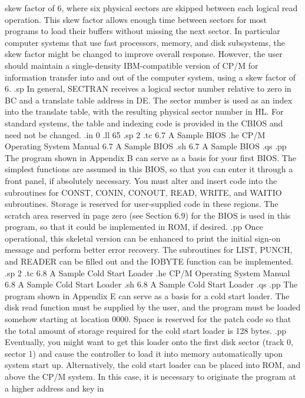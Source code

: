 skew factor of 6, where six physical sectors are 
skipped between each logical read operation.  
This skew factor allows enough time between 
sectors for most programs to load their buffers 
without missing the next sector.  In particular 
computer systems that use fast processors, 
memory, and disk subsystems, the skew factor might 
be changed to improve overall response.   
However, the user should maintain a single-density 
IBM-compatible version of CP/M for 
information transfer into and out of the 
computer system, using a skew factor of 6.  
.sp
In general, SECTRAN receives a logical sector 
number relative to zero in BC and a translate 
table address in DE.  The sector number is used 
as an index into the translate table, with the 
resulting physical sector number 
in HL.  For standard systems, the table and 
indexing code is provided in the CBIOS and 
need not be changed.
.in 0
.ll 65
.sp 2
.tc    6.7  A Sample BIOS
.he CP/M Operating System Manual                   6.7  A Sample BIOS
.sh
6.7  A Sample BIOS
.qs
.pp
The program shown in Appendix B can serve as a basis for your 
first BIOS.  The simplest functions are assumed in this BIOS, so 
that you can enter it through a front panel, if absolutely 
necessary.  You must alter and insert code into the 
subroutines for CONST, CONIN, CONOUT, READ, WRITE, and WAITIO 
subroutines.  Storage is reserved for user-supplied code in these 
regions.  The scratch area reserved in page zero (see Section 
6.9) for the BIOS is used in this program, so that it could be 
implemented in ROM, if desired.
.pp
Once operational, this skeletal version can be enhanced to print 
the initial sign-on message and perform better error recovery.  
The subroutines for LIST, PUNCH, and READER can be filled out and 
the IOBYTE function can be implemented.
.sp 2
.tc    6.8  A Sample Cold Start Loader
.he CP/M Operating System Manual      6.8  A Sample Cold Start Loader
.sh
6.8  A Sample Cold Start Loader
.qs
.pp
The program shown in Appendix E can serve as a basis for a cold 
start loader.  The disk read function must be supplied by the 
user, and the program must be loaded somehow starting at location 
0000.  Space is reserved for the patch code so that the total 
amount of storage required for the cold start loader is 128 
bytes.  
.pp
Eventually, you might want to get this 
loader onto the first disk sector (track 0, sector 1) and cause 
the controller to load it into memory automatically upon system 
start up.  Alternatively, the cold start loader can be placed 
into ROM, and above the CP/M system.  In this case, it is 
necessary to originate the program at a higher address and key in 
